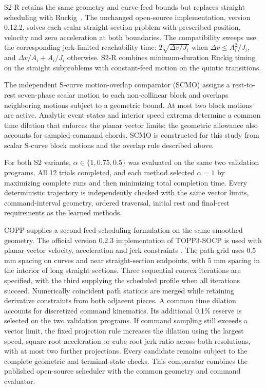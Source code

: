 \documentclass[pdflatex,sn-apa]{sn-jnl}
\begin{document}
S2-R retains the same geometry and curve-feed bounds but replaces straight scheduling with Ruckig~\citep{Berscheid2021Ruckig}. The unchanged open-source implementation, version 0.12.2, solves each scalar straight-section problem with prescribed position, velocity and zero acceleration at both boundaries. The compatibility sweeps use the corresponding jerk-limited reachability time: $2\sqrt{\Delta v/J_i}$ when $\Delta v\leq A_i^2/J_i$, and $\Delta v/A_i+A_i/J_i$ otherwise. S2-R combines minimum-duration Ruckig timing on the straight subproblems with constant-feed motion on the quintic transitions.

The independent S-curve motion-overlap comparator (SCMO) assigns a rest-to-rest seven-phase scalar motion to each non-collinear block and overlaps neighboring motions subject to a geometric bound. At most two block motions are active. Analytic event states and interior speed extrema determine a common time dilation that enforces the planar vector limits; the geometric allowance also accounts for sampled-command chords. SCMO is constructed for this study from scalar S-curve block motions and the overlap rule described above.

For both S2 variants, $\alpha\in\{1,0.75,0.5\}$ was evaluated on the same two validation programs. All 12 trials completed, and each method selected $\alpha=1$ by maximizing complete runs and then minimizing total completion time. Every deterministic trajectory is independently checked with the same vector limits, command-interval geometry, ordered traversal, initial rest and final-rest requirements as the learned methods.

COPP supplies a second feed-scheduling formulation on the same smoothed geometry. The official version 0.2.3 implementation of TOPP3-SOCP is used with planar vector velocity, acceleration and jerk constraints \citep{Wang2026COPPSoftware}. The path grid uses 0.5 mm spacing on curves and near straight-section endpoints, with 5 mm spacing in the interior of long straight sections. Three sequential convex iterations are specified, with the third supplying the scheduled profile when all iterations succeed. Numerically coincident path stations are merged while retaining derivative constraints from both adjacent pieces. A common time dilation accounts for discretized command kinematics. Its additional 0.1\% reserve is selected on the two validation programs. If command sampling still exceeds a vector limit, the fixed projection rule increases the dilation using the largest speed, square-root acceleration or cube-root jerk ratio across both resolutions, with at most two further projections. Every candidate remains subject to the complete geometric and terminal-state checks. This comparator combines the published open-source scheduler with the common geometry and command evaluator.
\end{document}
